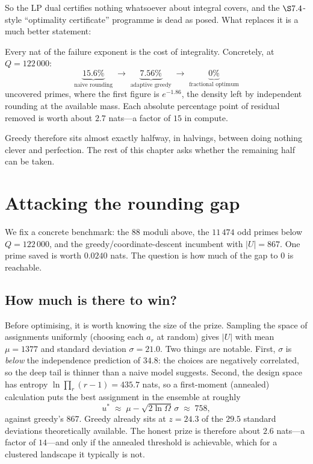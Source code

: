 So the LP dual certifies nothing whatsoever about integral covers, and the
$\S7.4$-style ``optimality certificate'' programme is dead as posed. What
replaces it is a much better statement:

\begin{corollary}\label{cor:rounding}
Every nat of the failure exponent is the cost of integrality. Concretely, at
$Q=122\,000$:
\[
\underbrace{15.6\%}_{\text{naive rounding}}\;\longrightarrow\;
\underbrace{7.56\%}_{\text{adaptive greedy}}\;\longrightarrow\;
\underbrace{0\%}_{\text{fractional optimum}}
\]
uncovered primes, where the first figure is $e^{-1.86}$, the density left by
independent rounding at the available mass. Each absolute percentage point of
residual removed is worth about $2.7$ nats---a factor of $15$ in compute.
\end{corollary}

Greedy therefore sits almost exactly halfway, in halvings, between doing nothing
clever and perfection. The rest of this chapter asks whether the remaining half
can be taken.

\section{Attacking the rounding gap}\label{sec:door1}

We fix a concrete benchmark: the $88$ moduli above, the $11\,474$ odd primes
below $Q=122\,000$, and the greedy/coordinate-descent incumbent with
$|U|=867$. One prime saved is worth $0.0240$ nats. The question is how much of
the gap to $0$ is reachable.

\subsection{How much is there to win?}

Before optimising, it is worth knowing the size of the prize. Sampling the space
of assignments uniformly (choosing each $a_r$ at random) gives
$|U|$ with mean $\mu=1377$ and standard deviation $\sigma=21.0$. Two things are
notable. First, $\sigma$ is \emph{below} the independence prediction of $34.8$:
the choices are negatively correlated, so the deep tail is thinner than a naive
model suggests. Second, the design space has entropy
$\ln\prod_r(r-1)=435.7$ nats, so a first-moment (annealed) calculation puts the
best assignment in the ensemble at roughly
\[
u^{*}\;\approx\;\mu-\sqrt{2\ln\Omega}\,\sigma\;\approx\;758 ,
\]
against greedy's $867$. Greedy already sits at $z=24.3$ of the $29.5$ standard
deviations theoretically available. The honest prize is therefore about
$2.6$ nats---a factor of $14$---and only if the annealed threshold is
achievable, which for a clustered landscape it typically is not.

